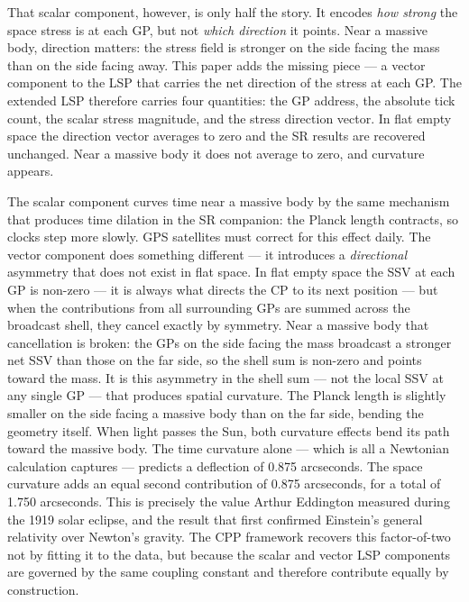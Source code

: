 \documentclass[12pt]{article}
\begin{document}
That scalar component, however, is only half the story. It encodes
\emph{how strong} the space stress is at each GP, but not
\emph{which direction} it points. Near a massive body, direction
matters: the stress field is stronger on the side facing the mass than
on the side facing away. This paper adds the missing piece --- a vector
component to the LSP that carries the net direction of the stress at
each GP. The extended LSP therefore carries four quantities: the GP
address, the absolute tick count, the scalar stress magnitude, and the
stress direction vector. In flat empty space the direction vector
averages to zero and the SR results are recovered unchanged. Near a
massive body it does not average to zero, and curvature appears.

The scalar component curves time near a massive body by the same
mechanism that produces time dilation in the SR companion: the Planck
length contracts, so clocks step more slowly. GPS satellites must
correct for this effect daily. The vector component does something
different --- it introduces a \emph{directional} asymmetry that does
not exist in flat space. In flat empty space the SSV at each GP is
non-zero --- it is always what directs the CP to its next position ---
but when the contributions from all surrounding GPs are summed across
the broadcast shell, they cancel exactly by symmetry. Near a massive
body that cancellation is broken: the GPs on the side facing the mass
broadcast a stronger net SSV than those on the far side, so the shell
sum is non-zero and points toward the mass. It is this asymmetry in
the shell sum --- not the local SSV at any single GP --- that produces
spatial curvature. The Planck length is slightly smaller on the side
facing a massive body than on the far side, bending the geometry
itself. When light passes the Sun, both curvature effects bend its
path toward the massive body. The time curvature alone --- which is
all a Newtonian calculation captures --- predicts a deflection of
0.875 arcseconds. The space curvature adds an equal second
contribution of 0.875 arcseconds, for a total of 1.750 arcseconds.
This is precisely the value Arthur Eddington measured during the 1919
solar eclipse, and the result that first confirmed Einstein's general
relativity over Newton's gravity. The CPP framework recovers this
factor-of-two not by fitting it to the data, but because the scalar
and vector LSP components are governed by the same coupling constant
and therefore contribute equally by construction.
\end{document}

